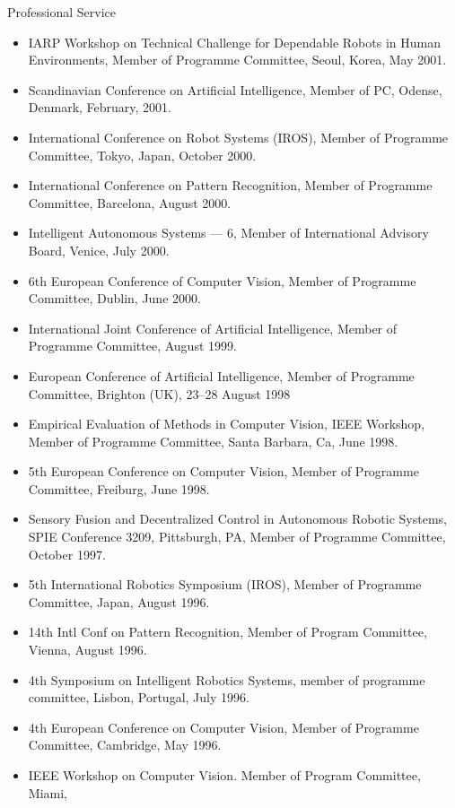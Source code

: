 \documentclass{article}
\begin{document}
\begin{cv}
\begin{cvlist}{Professional Service}
\begin{itemize}
    \item IARP Workshop on Technical Challenge for Dependable Robots in Human
          Environments, Member of Programme Committee, Seoul, Korea, May 2001.
    \item Scandinavian Conference on Artificial Intelligence, Member of PC, Odense,
          Denmark, February, 2001.
    \item International Conference on Robot Systems (IROS), Member of Programme
          Committee, Tokyo, Japan, October 2000.
    \item International Conference on Pattern Recognition, Member of Programme
          Committee, Barcelona, August 2000.
    \item Intelligent Autonomous Systems --- 6, Member of International Advisory
          Board, Venice, July 2000.
    \item 6th European Conference of Computer Vision, Member of Programme Committee,
          Dublin, June 2000.
    \item International Joint Conference of Artificial Intelligence, Member of
          Programme Committee, August 1999.
    \item European Conference of Artificial Intelligence, Member of Programme
          Committee, Brighton (UK), 23--28 August 1998
    \item Empirical Evaluation of Methods in Computer Vision, IEEE Workshop, Member
          of Programme Committee, Santa Barbara, Ca, June 1998.
    \item 5th European Conference on Computer Vision, Member of Programme Committee,
          Freiburg, June 1998.
    \item Sensory Fusion and Decentralized Control in Autonomous Robotic Systems,
          SPIE Conference 3209, Pittsburgh, PA, Member of Programme Committee,
          October 1997.
    \item 5th International Robotics Symposium (IROS), Member of Programme
          Committee, Japan, August 1996.
    \item 14th Intl Conf on Pattern Recognition, Member of Program Committee,
          Vienna, August 1996.
    \item 4th Symposium on Intelligent Robotics Systems, member of programme
          committee, Lisbon, Portugal, July 1996.
    \item 4th European Conference on Computer Vision, Member of Programme Committee,
          Cambridge, May 1996.
    \item IEEE Workshop on Computer Vision. Member of Program Committee, Miami,

\end{itemize}
\end{cvlist}
\end{cv}
\end{document}
